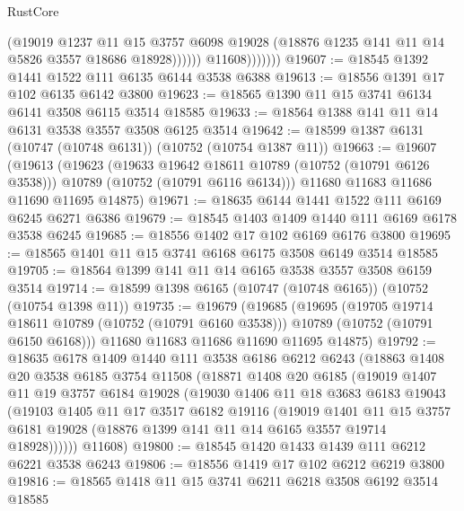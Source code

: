 \begin{lexlean}{RustCore}
\begin{coremodule}
                          (@19019
                            @1237
                            @11
                            @15
                            @3757
                            @6098
                            @19028
                            (@18876 @1235 @141 @11 @14 @5826 @3557 @18686 @18928))))))
                  @11608)))))))
@19607 := @18545 @1392 @1441 @1522 @111 @6135 @6144 @3538 @6388
@19613 := @18556 @1391 @17 @102 @6135 @6142 @3800
@19623 := @18565 @1390 @11 @15 @3741 @6134 @6141 @3508 @6115 @3514 @18585
@19633 := @18564 @1388 @141 @11 @14 @6131 @3538 @3557 @3508 @6125 @3514
@19642 := @18599 @1387 @6131 (@10747 (@10748 @6131)) (@10752 (@10754 @1387 @11))
@19663 := @19607
    (@19613
      (@19623
        (@19633 @19642 @18611 @10789 (@10752 (@10791 @6126 @3538)))
        @10789
        (@10752 (@10791 @6116 @6134)))
      @11680
      @11683
      @11686
      @11690
      @11695
      @14875)
@19671 := @18635 @6144 @1441 @1522 @111 @6169 @6245 @6271 @6386
@19679 := @18545 @1403 @1409 @1440 @111 @6169 @6178 @3538 @6245
@19685 := @18556 @1402 @17 @102 @6169 @6176 @3800
@19695 := @18565 @1401 @11 @15 @3741 @6168 @6175 @3508 @6149 @3514 @18585
@19705 := @18564 @1399 @141 @11 @14 @6165 @3538 @3557 @3508 @6159 @3514
@19714 := @18599 @1398 @6165 (@10747 (@10748 @6165)) (@10752 (@10754 @1398 @11))
@19735 := @19679
    (@19685
      (@19695
        (@19705 @19714 @18611 @10789 (@10752 (@10791 @6160 @3538)))
        @10789
        (@10752 (@10791 @6150 @6168)))
      @11680
      @11683
      @11686
      @11690
      @11695
      @14875)
@19792 := @18635
    @6178
    @1409
    @1440
    @111
    @3538
    @6186
    @6212
    @6243
    (@18863
      @1408
      @20
      @3538
      @6185
      @3754
      @11508
      (@18871
        @1408
        @20
        @6185
        (@19019
          @1407
          @11
          @19
          @3757
          @6184
          @19028
          (@19030
            @1406
            @11
            @18
            @3683
            @6183
            @19043
            (@19103
              @1405
              @11
              @17
              @3517
              @6182
              @19116
              (@19019
                @1401
                @11
                @15
                @3757
                @6181
                @19028
                (@18876 @1399 @141 @11 @14 @6165 @3557 @19714 @18928))))))
      @11608)
@19800 := @18545 @1420 @1433 @1439 @111 @6212 @6221 @3538 @6243
@19806 := @18556 @1419 @17 @102 @6212 @6219 @3800
@19816 := @18565 @1418 @11 @15 @3741 @6211 @6218 @3508 @6192 @3514 @18585

\end{coremodule}
\end{lexlean}
